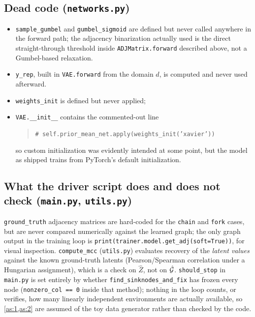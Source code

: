 \subsection{Dead code (\texttt{networks.py})}
\begin{itemize}[noitemsep,label={-}]
\item \texttt{sample\_gumbel} and \texttt{gumbel\_sigmoid} are defined but never called anywhere in the 
forward path; the adjacency binarization actually used is the direct straight-through threshold inside 
\texttt{ADJMatrix.forward} described above, not a Gumbel-based relaxation. 
\item \texttt{y\_rep}, built in \texttt{VAE.forward} from the domain $d$, is computed and never used 
afterward. 
\item \texttt{weights\_init} is defined but never applied; 
\item \texttt{VAE.\_\_init\_\_} contains the commented-out line
\begin{quote}
\texttt{\# self.prior\_mean\_net.apply(weights\_init('xavier'))}
\end{quote}
so custom initialization was evidently intended at some point, but the model as shipped trains from 
PyTorch's default initialization.
\end{itemize}

\subsection{What the driver script does and does not check (\texttt{main.py}, \texttt{utils.py})}
\texttt{ground\_truth} adjacency matrices are hard-coded for the \texttt{chain} and \texttt{fork} cases, but
are never compared numerically against the learned graph; the only graph output in the training loop is
\texttt{print(trainer.model.get\_adj(soft=True))}, for visual inspection. \texttt{compute\_mcc}
(\texttt{utils.py}) evaluates recovery of the \emph{latent values} against the known ground-truth latents
(Pearson/Spearman correlation under a Hungarian assignment), which is a check on $\hat Z$, not on $\hat{\mathcal{G}}$.
\texttt{should\_stop} in \texttt{main.py} is set entirely by whether \texttt{find\_sinknodes\_and\_fix} has
frozen every node (\texttt{nonzero\_col == 0} inside that method); nothing in the loop counts, or verifies,
how many linearly independent environments are actually available, so \cref{as:1,as:2} are assumed of the
toy data generator rather than checked by the code.

